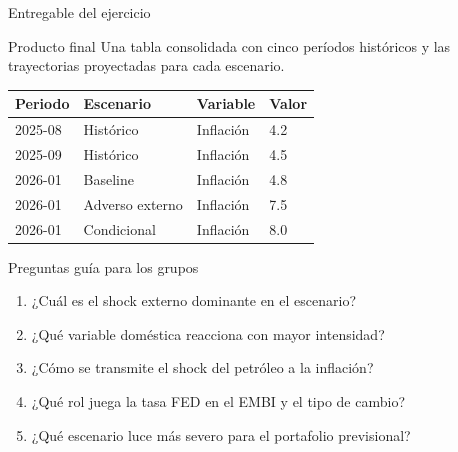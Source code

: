 \documentclass[10pt,aspectratio=169]{beamer}
\begin{document}
\begin{frame}{Entregable del ejercicio}

\begin{block}{Producto final}
Una tabla consolidada con cinco períodos históricos y las trayectorias proyectadas para cada escenario.
\end{block}

\begin{table}
\centering
\small
\begin{tabular}{llll}
\toprule
Periodo & Escenario & Variable & Valor \\
\midrule
2025-08 & Histórico & Inflación & 4.2 \\
2025-09 & Histórico & Inflación & 4.5 \\
2026-01 & Baseline & Inflación & 4.8 \\
2026-01 & Adverso externo & Inflación & 7.5 \\
2026-01 & Condicional & Inflación & 8.0 \\
\bottomrule
\end{tabular}
\end{table}

\end{frame}

\begin{frame}{Preguntas guía para los grupos}

\begin{enumerate}
    \item ¿Cuál es el shock externo dominante en el escenario?
    \item ¿Qué variable doméstica reacciona con mayor intensidad?
    \item ¿Cómo se transmite el shock del petróleo a la inflación?
    \item ¿Qué rol juega la tasa FED en el EMBI y el tipo de cambio?
    \item ¿Qué escenario luce más severo para el portafolio previsional?
\end{enumerate}

\end{frame}

\end{document}
